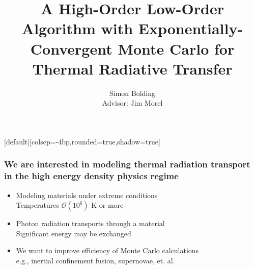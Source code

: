 \documentclass[xcolor=dvipsnames,hyperref={pdfpagelabels=false},unknownkeysallowed]{beamer}
\title[HOLO for TRT]{A High-Order Low-Order Algorithm with Exponentially-Convergent Monte Carlo for
    Thermal Radiative Transfer}
\author[S.R. Bolding]{{Simon Bolding \\ \vspace{0.1in}Advisor:  Jim Morel}}
\date{\vspace{-0.1in}{22 November 2016} }
\newcommand{\colb}[1]{{\color{blue} #1}}
\newcommand{\colG}[1]{{\color{Gray!110} #1}}
\newlength{\wideitemsep}
\let\olditem\item
\renewcommand{\item}{\setlength{\itemsep}{\wideitemsep}\olditem}
\begin{document}
[default][colsep=-4bp,rounded=true,shadow=true]

\def\beginpage{\null\vfill\bgroup
\offinterlineskip\leftskip=\z@}
\def\endpage{\egroup\eject}

\begin{frame}
    \titlepage \vspace{-0.213in}
    \begin{center}
    \end{center}    
\end{frame}

\setlength{\tabcolsep}{6pt}



\begin{frame}
\frametitle{We are interested in modeling thermal radiation transport \\ in the high energy
    density physics regime}
{\addtolength{\leftmargini}{-0.2in}
    \addtolength{\wideitemsep}{0.08in}
\begin{itemize}
    \item[] Modeling materials under extreme conditions \\ \colG{Temperatures $\mathcal{O}(10^6)$ K or more}
    \item[] Photon radiation transports through a material \\ 
        \colG{Significant \colb{energy}  may be exchanged}
 \item[] We want to improve efficiency of Monte Carlo calculations \\
     \colG{e.g., inertial confinement fusion, supernovae, et. al.}
    \end{itemize}}
\end{frame}
\end{document}
